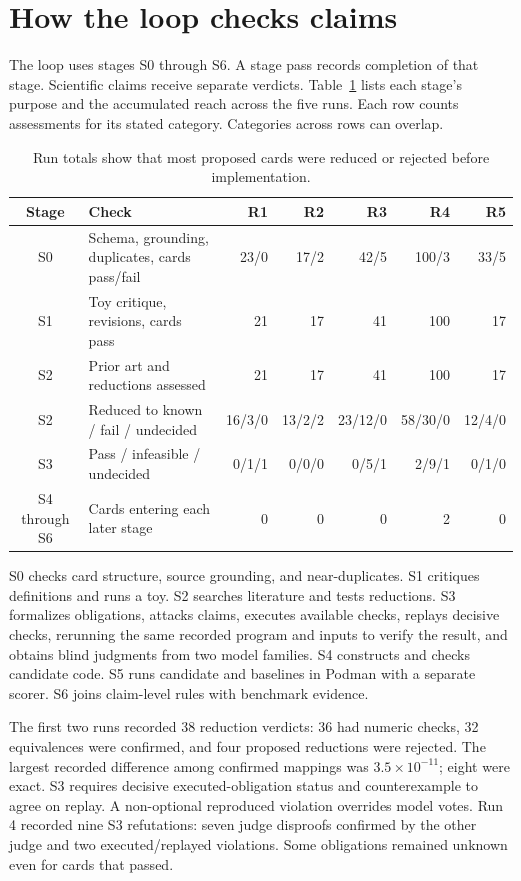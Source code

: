 \section{How the loop checks claims}

The loop uses stages S0 through S6. A stage pass records completion of that stage. Scientific claims receive separate verdicts. Table~\ref{tab:gates} lists each stage's purpose and the accumulated reach across the five runs. Each row counts assessments for its stated category. Categories across rows can overlap.

\begin{table}[ht]
\centering\scriptsize
\caption{Run totals show that most proposed cards were reduced or rejected before implementation.}
\label{tab:gates}
\begin{tabular}{clrrrrr}
\toprule
Stage & Check & R1 & R2 & R3 & R4 & R5 \\
\midrule
S0 & Schema, grounding, duplicates, cards pass/fail & 23/0 & 17/2 & 42/5 & 100/3 & 33/5 \\
S1 & Toy critique, revisions, cards pass & 21 & 17 & 41 & 100 & 17 \\
S2 & Prior art and reductions assessed & 21 & 17 & 41 & 100 & 17 \\
S2 & Reduced to known / fail / undecided & 16/3/0 & 13/2/2 & 23/12/0 & 58/30/0 & 12/4/0 \\
S3 & Pass / infeasible / undecided & 0/1/1 & 0/0/0 & 0/5/1 & 2/9/1 & 0/1/0 \\
S4 through S6 & Cards entering each later stage & 0 & 0 & 0 & 2 & 0 \\
\bottomrule
\end{tabular}
\end{table}

S0 checks card structure, source grounding, and near-duplicates. S1 critiques definitions and runs a toy. S2 searches literature and tests reductions. S3 formalizes obligations, attacks claims, executes available checks, replays decisive checks, rerunning the same recorded program and inputs to verify the result, and obtains blind judgments from two model families. S4 constructs and checks candidate code. S5 runs candidate and baselines in Podman with a separate scorer. S6 joins claim-level rules with benchmark evidence.

The first two runs recorded 38 reduction verdicts: 36 had numeric checks, 32 equivalences were confirmed, and four proposed reductions were rejected. The largest recorded difference among confirmed mappings was $3.5\times10^{-11}$; eight were exact. S3 requires decisive executed-obligation status and counterexample to agree on replay. A non-optional reproduced violation overrides model votes. Run 4 recorded nine S3 refutations: seven judge disproofs confirmed by the other judge and two executed/replayed violations. Some obligations remained unknown even for cards that passed.

